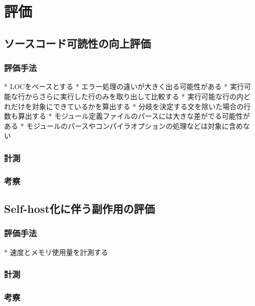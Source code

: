 \chapter{評価}
\label{evaluation}

\section{ソースコード可読性の向上評価}

\subsection{評価手法}

* LOCをベースとする
* エラー処理の違いが大きく出る可能性がある
    * 実行可能な行からさらに実行した行のみを取り出して比較する
    * 実行可能な行の内どれだけを対象にできているかを算出する
    * 分岐を決定する文を除いた場合の行数も算出する
* モジュール定義ファイルのパースには大きな差がでる可能性がある
    * モジュールのパースやコンパイラオプションの処理などは対象に含めない

\subsection{計測}

\subsection{考察}


\section{Self-host化に伴う副作用の評価}

\subsection{評価手法}

* 速度とメモリ使用量を計測する

\subsection{計測}

\subsection{考察}

